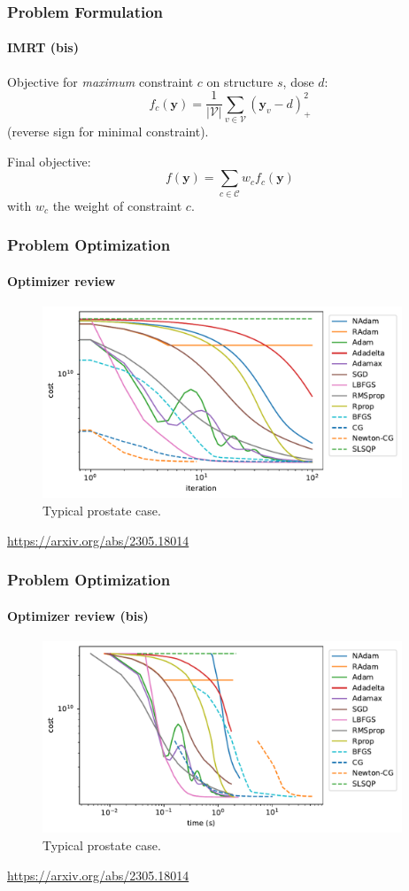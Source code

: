 \documentclass{beamer}
\begin{document}
	\begin{frame}
		\frametitle{Problem Formulation}
		\framesubtitle{IMRT (bis)}
		
		Objective for \textit{maximum} constraint $c$ on structure $s$, dose $d$:
		$$f_c(\textbf{y}) = \frac{1}{|\mathcal{V}|} \sum_{v \in \mathcal{V}} (\textbf{y}_v-d)_+^2$$
		(reverse sign for minimal constraint).
		\vspace{0.5cm}
		
		Final objective:
		$$f(\textbf{y}) = \sum_{c \in \mathcal{C}} w_c f_c(\textbf{y})$$
		with $w_c$ the weight of constraint $c$.
		
	\end{frame}
	
	\begin{frame}
		\frametitle{Problem Optimization}
		\framesubtitle{Optimizer review}
		
		\begin{figure}
			\includegraphics[width=10.75cm]{figures/ICMProstate-iter.pdf}
			\caption{Typical prostate case.}
		\end{figure}
		
		\url{https://arxiv.org/abs/2305.18014}
		
	\end{frame}
	
	\begin{frame}
		\frametitle{Problem Optimization}
		\framesubtitle{Optimizer review (bis)}
		
		\begin{figure}
			\includegraphics[width=10.75cm]{figures/ICMProstate-time.pdf}
			\caption{Typical prostate case.}
		\end{figure}
		
		\url{https://arxiv.org/abs/2305.18014}
	
	\end{frame}
	
\end{document}
